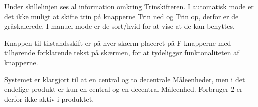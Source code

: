 Under skillelinjen ses al information omkring Trinskifteren. I automatisk mode er det ikke muligt at skifte trin på knapperne Trin ned og Trin op, derfor er de gråskalerede. I manuel mode er de sort/hvid for at vise at de kan benyttes.


Knappen til tilstandsskift er på hver skærm placeret på F-knapperne med tilhørende forklarende tekst på skærmen, for at tydeliggør funktonaliteten af knapperne.


Systemet er klargjort til at en central og to decentrale Måleenheder, men i det endelige produkt er kun en central og en decentral Måleenhed. Forbruger 2 er derfor ikke aktiv i produktet.